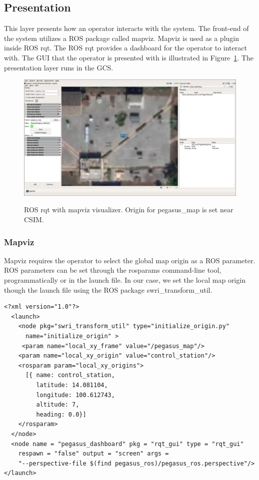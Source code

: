 \subsection{Presentation}

This layer presents how an operator interacts with the system. The front-end of the system utilizes a ROS package called mapviz. Mapviz is used as a plugin inside ROS rqt. The ROS rqt provides a dashboard for the operator to interact with. The GUI that the operator is presented with is illustrated in Figure~\ref{fig:mapviz-screenshot}. The presentation layer runs in the GCS.

\begin{figure}
	\centering
	\caption[Pegasus presentation dashboard]{\small ROS rqt with mapviz visualizer. Origin for pegasus\_map is set near CSIM.}
	\includegraphics[width=5in]{figures/methodology/presentation/mapviz-1}
	\label{fig:mapviz-screenshot}
\end{figure}


\subsubsection{Mapviz}
Mapviz requires the operator to select the global map origin as a ROS parameter. ROS parameters can be set through the rosparams command-line tool, programmatically or in the launch file. In our case, we set the local map origin though the launch file using the ROS package swri\_transform\_util.


\begin{verbatim}
<?xml version="1.0"?>
  <launch>
    <node pkg="swri_transform_util" type="initialize_origin.py"
      name="initialize_origin" >
     <param name="local_xy_frame" value="/pegasus_map"/>
    <param name="local_xy_origin" value="control_station"/>
    <rosparam param="local_xy_origins">
      [{ name: control_station,
         latitude: 14.081104,
         longitude: 100.612743,
         altitude: 7,
         heading: 0.0}]
    </rosparam>
  </node>
  <node name = "pegasus_dashboard" pkg = "rqt_gui" type = "rqt_gui" 
    respawn = "false" output = "screen" args = 
    "--perspective-file $(find pegasus_ros)/pegasus_ros.perspective"/>
</launch>
\end{verbatim}


